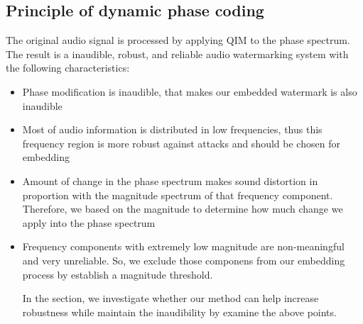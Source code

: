 \subsection {Principle of dynamic phase coding}
The original audio signal is processed by applying QIM to the phase spectrum. The result is a inaudible, robust, and reliable audio watermarking system with the following characteristics:
\begin{itemize}
\item{Phase modification is inaudible, that makes our embedded watermark is also inaudible}
\item{Most of audio information is distributed in low frequencies, thus this frequency region is more robust against attacks and should be chosen for embedding}
\item{Amount of change in the phase spectrum makes sound distortion in proportion with the magnitude spectrum of that frequency component. Therefore, we based on the magnitude to determine how much change we apply into the phase spectrum}
\item{Frequency components with extremely low magnitude are non-meaningful and very unreliable. So, we exclude those componens from our embedding process by establish a magnitude threshold.}

In the section, we investigate whether our method can help increase robustness while maintain the inaudibility by examine the above points.
\end{itemize}

